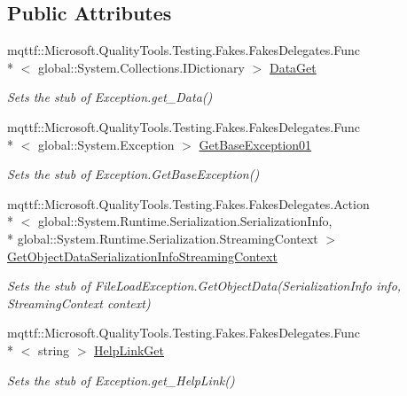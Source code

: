 \subsection*{Public Attributes}
\begin{DoxyCompactItemize}
\item 
mqttf\-::\-Microsoft.\-Quality\-Tools.\-Testing.\-Fakes.\-Fakes\-Delegates.\-Func\\*
$<$ global\-::\-System.\-Collections.\-I\-Dictionary $>$ \hyperlink{class_system_1_1_i_o_1_1_fakes_1_1_stub_file_load_exception_a0db4024bb366038dacb9ecc86ef0f1a2}{Data\-Get}
\begin{DoxyCompactList}\small\item\em Sets the stub of Exception.\-get\-\_\-\-Data()\end{DoxyCompactList}\item 
mqttf\-::\-Microsoft.\-Quality\-Tools.\-Testing.\-Fakes.\-Fakes\-Delegates.\-Func\\*
$<$ global\-::\-System.\-Exception $>$ \hyperlink{class_system_1_1_i_o_1_1_fakes_1_1_stub_file_load_exception_ae00a1966d15216a6674be0bf2afe51da}{Get\-Base\-Exception01}
\begin{DoxyCompactList}\small\item\em Sets the stub of Exception.\-Get\-Base\-Exception()\end{DoxyCompactList}\item 
mqttf\-::\-Microsoft.\-Quality\-Tools.\-Testing.\-Fakes.\-Fakes\-Delegates.\-Action\\*
$<$ global\-::\-System.\-Runtime.\-Serialization.\-Serialization\-Info, \\*
global\-::\-System.\-Runtime.\-Serialization.\-Streaming\-Context $>$ \hyperlink{class_system_1_1_i_o_1_1_fakes_1_1_stub_file_load_exception_ae60ea30f2686a1b3325407d52748660a}{Get\-Object\-Data\-Serialization\-Info\-Streaming\-Context}
\begin{DoxyCompactList}\small\item\em Sets the stub of File\-Load\-Exception.\-Get\-Object\-Data(\-Serialization\-Info info, Streaming\-Context context)\end{DoxyCompactList}\item 
mqttf\-::\-Microsoft.\-Quality\-Tools.\-Testing.\-Fakes.\-Fakes\-Delegates.\-Func\\*
$<$ string $>$ \hyperlink{class_system_1_1_i_o_1_1_fakes_1_1_stub_file_load_exception_afa7e8707fb6099ba557ea02912aa45ba}{Help\-Link\-Get}
\begin{DoxyCompactList}\small\item\em Sets the stub of Exception.\-get\-\_\-\-Help\-Link()\end{DoxyCompactList}\item 

\end{DoxyCompactItemize}
